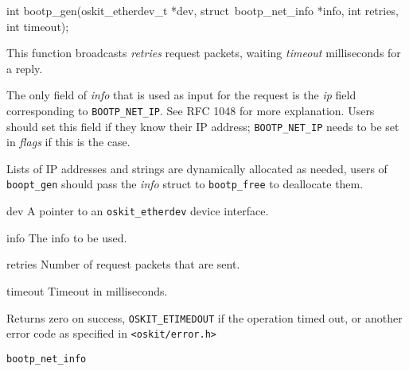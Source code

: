 %
%
\begin{apisyn}

	\funcproto int bootp_gen(oskit_etherdev_t *dev, 
		\inoutparam struct~bootp_net_info *info,
		int retries, int timeout);
\end{apisyn}
\begin{apidesc}
	This function broadcasts \emph{retries} \bootp{} request packets,  
	waiting \emph{timeout} milliseconds for a reply.

	The only field of \emph{info} that is used as input for the request
	is the \emph{ip} field corresponding to \texttt{BOOTP_NET_IP}.
	See RFC 1048 for more explanation. Users should set this
	field if they know their IP address; \texttt{BOOTP_NET_IP}
	needs to be set in \emph{flags} if this is the case.

	Lists of IP addresses and strings are dynamically
	allocated as needed, users of \texttt{boopt_gen}
	should pass the \emph{info} struct to 
	\texttt{bootp_free} to deallocate them.
\end{apidesc}
\begin{apiparm}
	\item[dev]
		A pointer to an \texttt{oskit_etherdev} device interface.

	\item[info]
		The \bootp{} info to be used. 

	\item[retries]
		Number of \bootp{} request packets that are sent.

	\item[timeout]
		Timeout in milliseconds.
\end{apiparm}
\begin{apiret}
	Returns zero on success, \texttt{OSKIT_ETIMEDOUT} if the
	operation timed out, or another error code as specified in
	{\tt <oskit/error.h>}
\end{apiret}
\begin{apirel}
	\texttt{bootp_net_info}
\end{apirel}

